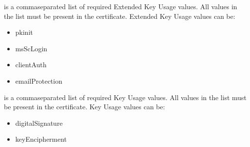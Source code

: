 \documentclass[letterpaper,10pt,english]{sphinxmanual}
\begin{document}
\begin{description}
\begin{description}
\begin{quote}
\begin{DUlineblock}{0em}
\item[] 
\item[] 
\item[] 
\item[] 
\item[] 
\end{DUlineblock}
\end{quote}

\sphinxAtStartPar
{} is a comma\sphinxhyphen{}separated list of
required Extended Key Usage values.  All values in the list
must be present in the certificate.  Extended Key Usage values
can be:
\begin{itemize}
\item {} 
\sphinxAtStartPar
pkinit

\item {} 
\sphinxAtStartPar
msScLogin

\item {} 
\sphinxAtStartPar
clientAuth

\item {} 
\sphinxAtStartPar
emailProtection

\end{itemize}

\sphinxAtStartPar
{} is a comma\sphinxhyphen{}separated list of required Key
Usage values.  All values in the list must be present in the
certificate.  Key Usage values can be:
\begin{itemize}
\item {} 
\sphinxAtStartPar
digitalSignature

\item {} 
\sphinxAtStartPar
keyEncipherment

\end{itemize}

\end{description}


\end{description}
\end{document}
